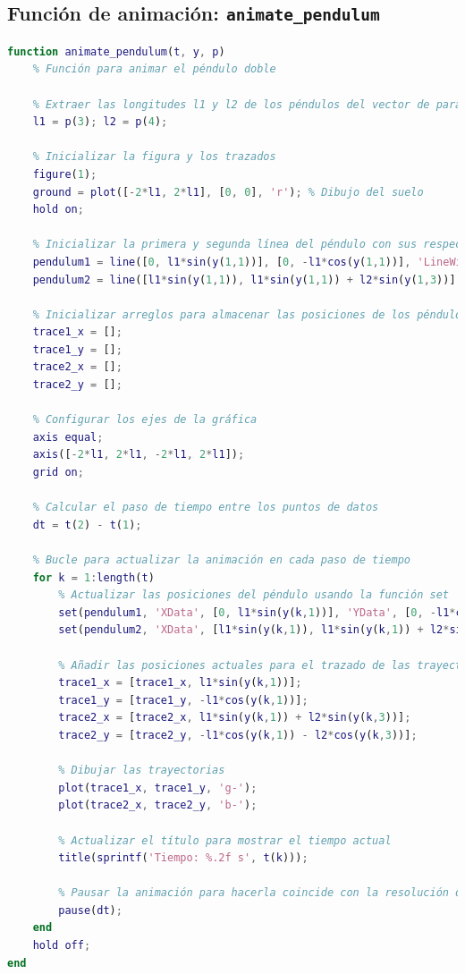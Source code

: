 \documentclass[12pt]{article}
\begin{document}
\subsection{Función de animación: \texttt{animate\_pendulum}}
\begin{lstlisting}[language=Matlab]
function animate_pendulum(t, y, p)
    % Función para animar el péndulo doble
    
    % Extraer las longitudes l1 y l2 de los péndulos del vector de parámetros p
    l1 = p(3); l2 = p(4);
    
    % Inicializar la figura y los trazados
    figure(1);
    ground = plot([-2*l1, 2*l1], [0, 0], 'r'); % Dibujo del suelo
    hold on;
    
    % Inicializar la primera y segunda línea del péndulo con sus respectivas masas
    pendulum1 = line([0, l1*sin(y(1,1))], [0, -l1*cos(y(1,1))], 'LineWidth', 2, 'Marker', 'o', 'MarkerSize', 10);
    pendulum2 = line([l1*sin(y(1,1)), l1*sin(y(1,1)) + l2*sin(y(1,3))], [-l1*cos(y(1,1)), -l1*cos(y(1,1)) - l2*cos(y(1,3))], 'LineWidth', 2, 'Marker', 'o', 'MarkerSize', 10);
    
    % Inicializar arreglos para almacenar las posiciones de los péndulos con el fin de trazar su trayectoria
    trace1_x = [];
    trace1_y = [];
    trace2_x = [];
    trace2_y = [];
    
    % Configurar los ejes de la gráfica
    axis equal;
    axis([-2*l1, 2*l1, -2*l1, 2*l1]);
    grid on;
    
    % Calcular el paso de tiempo entre los puntos de datos
    dt = t(2) - t(1);
    
    % Bucle para actualizar la animación en cada paso de tiempo
    for k = 1:length(t)
        % Actualizar las posiciones del péndulo usando la función set
        set(pendulum1, 'XData', [0, l1*sin(y(k,1))], 'YData', [0, -l1*cos(y(k,1))]);
        set(pendulum2, 'XData', [l1*sin(y(k,1)), l1*sin(y(k,1)) + l2*sin(y(k,3))], 'YData', [-l1*cos(y(k,1)), -l1*cos(y(k,1)) - l2*cos(y(k,3))]);
        
        % Añadir las posiciones actuales para el trazado de las trayectorias
        trace1_x = [trace1_x, l1*sin(y(k,1))];
        trace1_y = [trace1_y, -l1*cos(y(k,1))];
        trace2_x = [trace2_x, l1*sin(y(k,1)) + l2*sin(y(k,3))];
        trace2_y = [trace2_y, -l1*cos(y(k,1)) - l2*cos(y(k,3))];
        
        % Dibujar las trayectorias
        plot(trace1_x, trace1_y, 'g-');
        plot(trace2_x, trace2_y, 'b-');
        
        % Actualizar el título para mostrar el tiempo actual
        title(sprintf('Tiempo: %.2f s', t(k)));
        
        % Pausar la animación para hacerla coincide con la resolución de la solución ODE
        pause(dt);
    end
    hold off;
end

\end{lstlisting}
\end{document}
